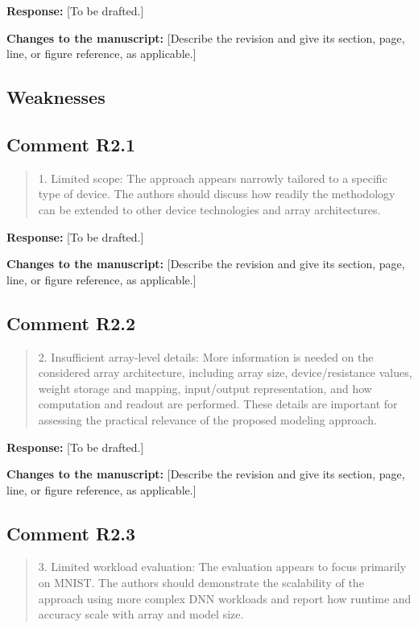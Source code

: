 \documentclass[11pt,a4paper]{article}
\newenvironment{reviewercomment}
  {\begin{quote}\small\color{reviewerblue}}
  {\end{quote}}
\newcommand{\placeholder}[1]{[#1]}
\begin{document}
\noindent\textbf{Response:}
\placeholder{To be drafted.}

\noindent\textbf{Changes to the manuscript:}
\placeholder{Describe the revision and give its section, page, line, or figure reference, as applicable.}

\subsection*{Weaknesses}

\subsection*{Comment R2.1}
\begin{reviewercomment}
1. Limited scope: The approach appears narrowly tailored to a specific
type of device. The authors should discuss how readily the methodology
can be extended to other device technologies and array architectures.
\end{reviewercomment}

\noindent\textbf{Response:}
\placeholder{To be drafted.}

\noindent\textbf{Changes to the manuscript:}
\placeholder{Describe the revision and give its section, page, line, or figure reference, as applicable.}

\subsection*{Comment R2.2}
\begin{reviewercomment}
2. Insufficient array-level details: More information is needed on the
considered array architecture, including array size, device/resistance
values, weight storage and mapping, input/output representation, and how
computation and readout are performed. These details are important for
assessing the practical relevance of the proposed modeling approach.
\end{reviewercomment}

\noindent\textbf{Response:}
\placeholder{To be drafted.}

\noindent\textbf{Changes to the manuscript:}
\placeholder{Describe the revision and give its section, page, line, or figure reference, as applicable.}

\subsection*{Comment R2.3}
\begin{reviewercomment}
3. Limited workload evaluation: The evaluation appears to focus primarily
on MNIST. The authors should demonstrate the scalability of the approach
using more complex DNN workloads and report how runtime and accuracy
scale with array and model size.
\end{reviewercomment}
\end{document}
